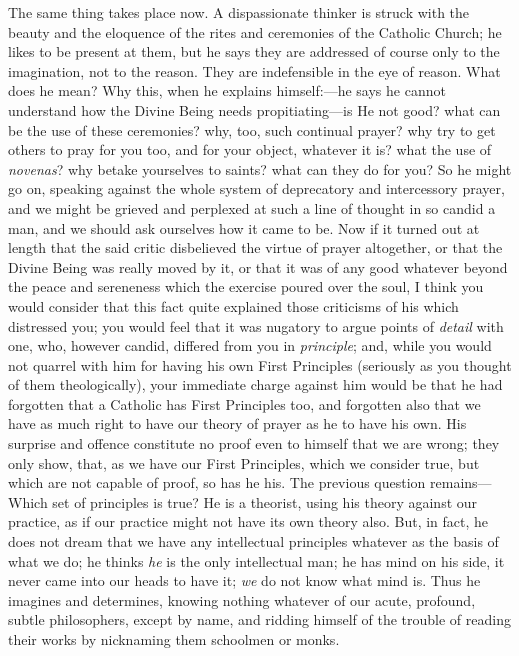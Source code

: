 The same thing takes place now. A dispassionate
thinker is struck with the beauty and the eloquence of
the rites and ceremonies of the Catholic Church; he likes
to be present at them, but he says they are addressed of
course only to the imagination, not to the reason. They
are indefensible in the eye of reason. What does he mean?
Why this, when he explains himself:—he says he
cannot understand how the Divine Being needs
propitiating—is He not good? what can be the use of
these ceremonies? why, too, such continual prayer? why
try to get others to pray for you too, and for your
object, whatever it is? what the use of \emph{novenas}?
why betake yourselves to saints? what can they do for
you? So he might go on, speaking against the whole system
of deprecatory and intercessory prayer, and we might be
grieved and perplexed at such a line of thought in so
candid a man, and we should ask ourselves how it came to
be. Now if it turned out at length that the said critic
disbelieved the virtue of prayer altogether, or that the
Divine Being was really moved by it, or that it was of
any good whatever beyond the peace and sereneness which
the exercise poured over the soul, I think you would
consider that this fact quite explained those criticisms
of his which distressed you; you would feel that it was
nugatory to argue points of \emph{detail} with one,
who, however candid, differed from you in \emph{principle};
and, while you would not quarrel with him for having his
own First Principles (seriously as you thought of them
theologically), your immediate charge against him would
be that he had forgotten that a Catholic has First
Principles too, and forgotten also that we have as much
right to have our theory of prayer as he to have his own.
His surprise and offence constitute no proof even to
himself that we are wrong; they only show, that, as we
have our First Principles, which we consider true, but
which are not capable of proof, so has he his. The
previous question remains—Which set of principles is
true? He is a theorist, using his theory against our
practice, as if our practice might not have its own
theory also. But, in fact, he does not dream that we have
any intellectual principles whatever as the basis of what
we do; he thinks \emph{he} is the only intellectual
man; he has mind on his side, it never came into our
heads to have it; \emph{we} do not know what mind is.
Thus he imagines and determines, knowing nothing whatever
of our acute, profound, subtle philosophers, except by
name, and ridding himself of the trouble of reading their
works by nicknaming them schoolmen or monks.

